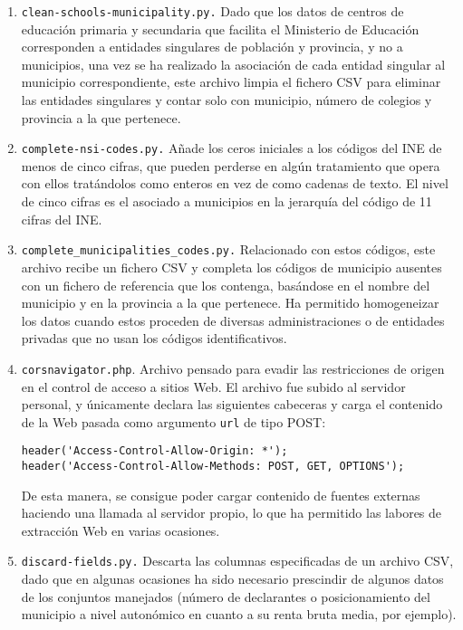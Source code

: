 \begin{enumerate}
    \item \texttt{clean-schools-municipality.py.} Dado que los datos de centros de educación primaria y secundaria que facilita el Ministerio de Educación corresponden a entidades singulares de población y provincia, y no a municipios, una vez se ha realizado la asociación de cada entidad singular al municipio correspondiente, este archivo limpia el fichero CSV para eliminar las entidades singulares y contar solo con municipio, número de colegios y provincia a la que pertenece.
    
    \item \texttt{complete-nsi-codes.py.} Añade los ceros iniciales a los códigos del INE de menos de cinco cifras, que pueden perderse en algún tratamiento que opera con ellos tratándolos como enteros en vez de como cadenas de texto. El nivel de cinco cifras es el asociado a municipios en la jerarquía del código de 11 cifras del INE.
    
    \item \texttt{complete\_municipalities\_codes.py.} Relacionado con estos códigos, este archivo recibe un fichero CSV y completa los códigos de municipio ausentes con un fichero de referencia que los contenga, basándose en el nombre del municipio y en la provincia a la que pertenece. Ha permitido homogeneizar los datos cuando estos proceden de diversas administraciones o de entidades privadas que no usan los códigos identificativos.
    
    \item \texttt{corsnavigator.php}. Archivo pensado para evadir las restricciones de origen en el control de acceso a sitios Web. El archivo fue subido al servidor personal, y únicamente declara las siguientes cabeceras y carga el contenido de la Web pasada como argumento \texttt{url} de tipo POST:
    \begin{verbatim}
header('Access-Control-Allow-Origin: *');
header('Access-Control-Allow-Methods: POST, GET, OPTIONS');
    \end{verbatim}
    
    De esta manera, se consigue poder cargar contenido de fuentes externas haciendo una llamada al servidor propio, lo que ha permitido las labores de extracción Web en varias ocasiones.

    \item \texttt{discard-fields.py.} Descarta las columnas especificadas de un archivo CSV, dado que en algunas ocasiones ha sido necesario prescindir de algunos datos de los conjuntos manejados (número de declarantes o posicionamiento del municipio a nivel autonómico en cuanto a su renta bruta media, por ejemplo).
       

\end{enumerate}
